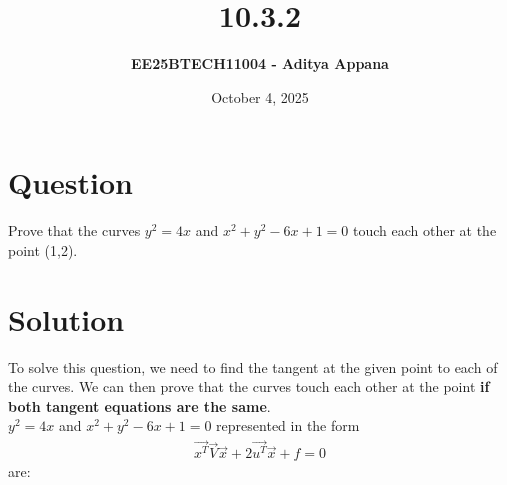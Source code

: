 \documentclass[12pt]{article}
\title{\textbf{10.3.2}}
\author{\textbf{EE25BTECH11004 - Aditya Appana}}
\date{October 4, 2025}
\begin{document}
\maketitle

\section*{Question}
Prove that the curves $y^2 = 4x$ and $x^2 + y^2-6x + 1 = 0$ touch each other at the point (1,2).
\section*{Solution}
To solve this question, we need to find the tangent at the given point to each of the curves. We can then prove that the curves touch each other at the point \textbf{if both tangent equations are the same}.\\
$y^2 = 4x$ and $x^2 + y^2-6x + 1 = 0$ represented in the form \setcounter{equation}{-1} \begin{align}\vec{x^T}\vec{V}\vec{x} + 2\vec{u^T}\vec{x}+f = 0\end{align} are:
\end{document}
